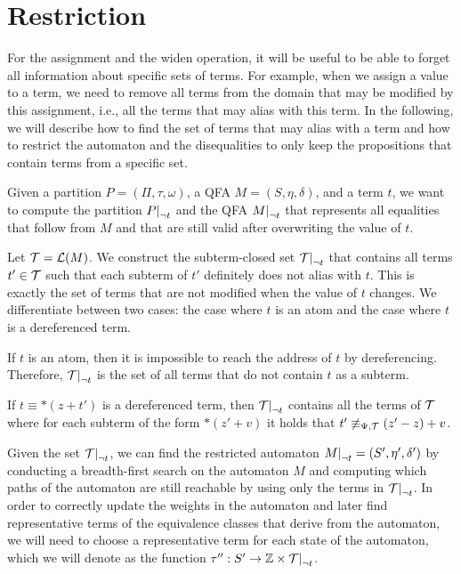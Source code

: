 \section{Restriction}


For the assignment and the widen operation, it will be useful to be able to forget all information about specific sets of terms.
For example, when we assign a value to a term, we need to remove all terms from the domain that may be modified by this assignment, i.e., all the terms that may alias with this term.
In the following, we will describe how to find the set of terms that may alias with a term and how to restrict the automaton and the disequalities to only keep the propositions that contain terms from a specific set.

Given a partition $P = (\Pi, \tau, \omega)$, a QFA $M = (S, \eta, \delta)$, and a term $t$, we want to compute the partition $\restr{P}{\neg t}$ and the QFA $\restr{M}{\neg t}$ that represents all equalities that follow from $M$ and that are still valid after overwriting the value of $t$.

Let $\mathcal{T} = \mathcal{L}(M)$. We construct the subterm-closed set $\restr{\T}{\neg t}$ that contains all terms $t' \in \mathcal{T}$ such that each subterm of $t'$ definitely does not alias with $t$.
This is exactly the set of terms that are not modified when the value of $t$ changes.
We differentiate between two cases: the case where $t$ is an atom and the case where $t$ is a dereferenced term.

If $t$ is an atom, then it is impossible to reach the address of $t$ by dereferencing.
Therefore, $\restr{\T}{\neg t}$ is the set of all terms that do not contain $t$ as a subterm.

If $t \equiv *(z + t')$ is a dereferenced term, then $\restr{\T}{\neg t}$ contains all the terms of $\mathcal{T}$ where for each subterm of the form $*(z' + v)$ it holds that $t' \not\equiv_{\Psi,\mathcal{T}} (z' - z) + v$.

Given the set $\restr{\T}{\neg t}$, we can find the restricted automaton $\restr{M}{\neg t} = (S', \eta', \delta')$ by conducting a breadth-first search on the automaton $M$ and computing which paths of the automaton are still reachable by using only the terms in $\restr{\T}{\neg t}$.
In order to correctly update the weights in the automaton and later find representative terms of the equivalence classes that derive from the automaton, we will need to choose a representative term for each state of the automaton, which we will denote as the function $\repr : S' \rightarrow \Z \times \restr{\T}{\neg t}$.

